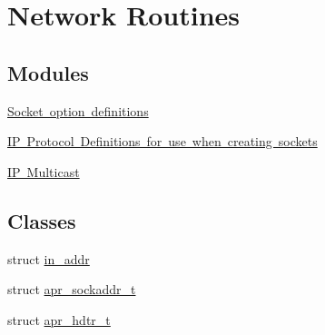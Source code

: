 \hypertarget{group__apr__network__io}{}\section{Network Routines}
\label{group__apr__network__io}
\subsection*{Modules}
\begin{DoxyCompactItemize}
\item 
\mbox{\hyperlink{group__apr__sockopt}{Socket option definitions}}
\item 
\mbox{\hyperlink{group___i_p___proto}{I\+P Protocol Definitions for use when creating sockets}}
\item 
\mbox{\hyperlink{group__apr__mcast}{I\+P Multicast}}
\end{DoxyCompactItemize}
\subsection*{Classes}
\begin{DoxyCompactItemize}
\item 
struct \mbox{\hyperlink{structin__addr}{in\+\_\+addr}}
\item 
struct \mbox{\hyperlink{structapr__sockaddr__t}{apr\+\_\+sockaddr\+\_\+t}}
\item 
struct \mbox{\hyperlink{structapr__hdtr__t}{apr\+\_\+hdtr\+\_\+t}}
\end{DoxyCompactItemize}
